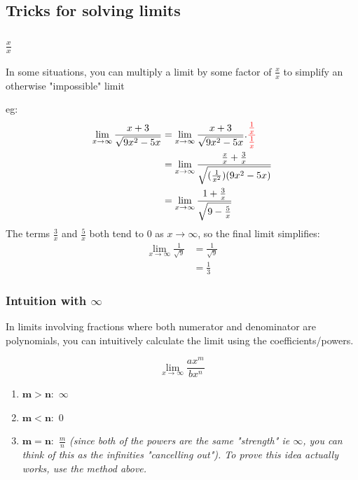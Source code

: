 \documentclass[12pt]{article}
\begin{document}
\subsection{Tricks for solving limits}
\setlength\itemsep{5em}
\subsubsection{\texorpdfstring{$\frac{x}{x}$}{TEXT}}

In some situations, you can multiply a limit by some factor of $\frac{x}{x}$ to simplify an otherwise "impossible" limit

eg:
\begin{equation}
\begin{split}
    \lim_{x\to\infty} \frac{x+3}{\sqrt{9x^2-5x}}
     & = \lim_{x\to\infty} \frac{x+3}{\sqrt{9x^2-5x}} . \textcolor{red}{\frac{\frac{1}{x}}{\frac{1}{x}}}\\
     & = \lim_{x\to\infty} \frac{\frac{x}{x}+\frac{3}{x}}{\sqrt{(\frac{1}{x^2})(9x^2-5x)}}\\
     & = \lim_{x\to\infty} \frac{1+\frac{3}{x}}{\sqrt{9-\frac{5}{x}}}
 \end{split}
\end{equation}      
The terms $\frac{3}{x}$ and $\frac{5}{x}$ both tend to $0$ as $x \to \infty$, so the final limit simplifies:
\begin{equation}
\begin{split}
    \lim_{x\to\infty} \frac{1}{\sqrt{9}}
     & = \frac{1}{\sqrt{9}}\\
     & = \frac{1}{3}
 \end{split}
\end{equation}  

\subsubsection{Intuition with \texorpdfstring{$\infty$}{TEXT}}

In limits involving fractions where both numerator and denominator are polynomials, you can intuitively calculate the limit using the coefficients/powers.

$$
    \lim_{x\to\infty} \frac{ax^{m}}{bx^n}
$$
\begin{enumerate}
    \item $\mathbf{m > n}:$ $\infty$
    \item $\mathbf{m < n}:$ $0$ 
    \item $\mathbf{m = n}:$  $\frac{m}{n}$ \textit{(since both of the powers are the same "strength" ie $\infty$, you can think of this as the infinities "cancelling out"). To prove this idea actually works, use the method above.}
\end{enumerate}
\end{document}
